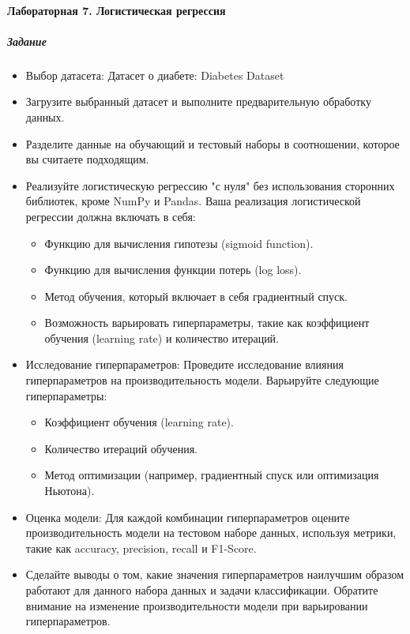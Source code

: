 \documentclass[12pt,onecolumn]{article}
\begin{document}
\paragraph{Лабораторная 7.  Логистическая регрессия}
\subparagraph{Задание}
\begin{itemize}
  \item Выбор датасета: Датасет о диабете: Diabetes Dataset
  \item Загрузите выбранный датасет и выполните предварительную обработку данных. 
  \item Разделите данные на обучающий и тестовый наборы в соотношении, которое вы считаете подходящим.
  \item Реализуйте логистическую регрессию "с нуля" без использования сторонних библиотек, кроме NumPy и Pandas. Ваша реализация логистической регрессии должна включать в себя:
  \begin{itemize}
    \item Функцию для вычисления гипотезы (sigmoid function).
    \item Функцию для вычисления функции потерь (log loss).
    \item Метод обучения, который включает в себя градиентный спуск.
    \item Возможность варьировать гиперпараметры, такие как коэффициент обучения (learning rate) и количество итераций.
  \end{itemize}
  \item Исследование гиперпараметров: Проведите исследование влияния гиперпараметров на производительность модели. Варьируйте следующие гиперпараметры:
  \begin{itemize}
    \item Коэффициент обучения (learning rate).
    \item Количество итераций обучения.
    \item Метод оптимизации (например, градиентный спуск или оптимизация Ньютона).
  \end{itemize}
  \item Оценка модели: Для каждой комбинации гиперпараметров оцените производительность модели на тестовом наборе данных, используя метрики, такие как accuracy, precision, recall и F1-Score.
  \item Сделайте выводы о том, какие значения гиперпараметров наилучшим образом работают для данного набора данных и задачи классификации. Обратите внимание на изменение производительности модели при варьировании гиперпараметров.
\end{itemize}
\end{document}
